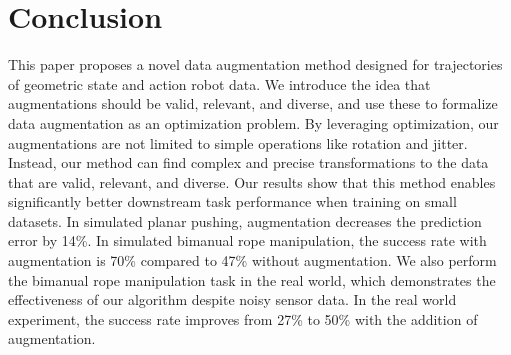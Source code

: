 \section{Conclusion}  \label{RSS:sec:conclusion}

This paper proposes a novel data augmentation method designed for trajectories of geometric state and action robot data. We introduce the idea that augmentations should be valid, relevant, and diverse, and use these to formalize data augmentation as an optimization problem. By leveraging optimization, our augmentations are not limited to simple operations like rotation and jitter. Instead, our method can find complex and precise transformations to the data that are valid, relevant, and diverse. Our results show that this method enables significantly better downstream task performance when training on small datasets. In simulated planar pushing, augmentation decreases the prediction error by 14\%. In simulated bimanual rope manipulation, the success rate with augmentation is 70\% compared to 47\% without augmentation. We also perform the bimanual rope manipulation task in the real world, which demonstrates the effectiveness of our algorithm despite noisy sensor data. In the real world experiment, the success rate improves from 27\% to 50\% with the addition of augmentation.
